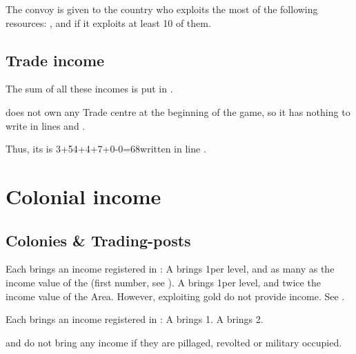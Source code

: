 \aparag The  convoy is given to the country who
exploits the most of the following resources: ,  and  if it exploits at least 10 of them.

\subsection{Trade income}
\aparag The sum of all these incomes is put in .

\begin{exemple}
  \POR does not own any Trade centre at the beginning of the game, so it
  has nothing to write in lines  and
  .

  Thus, its  is 3+54+4+7+0-0=68\ducats written in
  line .
\end{exemple}

\section{Colonial income}\label{chIncomes:ColonialIncome}
\subsection{Colonies \& Trading-posts}

\aparag Each \COL brings an income registered in :
\bparag A \COL\facemoins brings 1\ducats per level, and as many \ducats
as the income value of the \Area (first number, see
).
\bparag A \COL\faceplus brings 1\ducats per level, and twice the income
value of the Area.
\bparag However, \COL exploiting gold do not provide income. See
.

\aparag Each \TP brings an income registered in :
\bparag A \TP\facemoins brings 1\ducats.
\bparag A \TP\faceplus brings 2\ducats.

\bparag \COL and \TP do not bring any income if they are pillaged,
revolted or military occupied.

